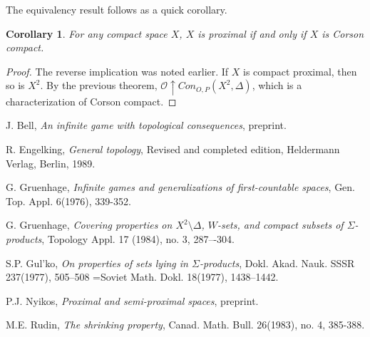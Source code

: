 \documentclass{amsart}
\newtheorem{cor}[thm]{Corollary}
\theoremstyle{definition}
\theoremstyle{remark}
\newcommand{\<}{\langle}
\renewcommand{\>}{\rangle}
\newcommand{\congame}[2]{Con_{O,P}(#1,#2)}
\newcommand{\pl}[1]{\mathscr{#1}}
\newcommand{\win}{\uparrow}
\begin{document}
The equivalency result follows as a quick corollary.

\begin{cor}
  For any compact space $X$, $X$ is proximal if and only if $X$ is Corson compact.
\end{cor}

\begin{proof}
  The reverse implication was noted earlier. If $X$ is compact proximal, then so is $X^2$. By the previous theorem, $\pl O\win\congame{X^2}{\Delta}$, which is a characterization of Corson compact.
\end{proof}




\begin{thebibliography}{99}
 J. Bell,
  \emph{An infinite game with topological consequences}, preprint.

  R. Engelking,
  \emph{General topology}, Revised and completed edition, Heldermann Verlag, Berlin, 1989.




 G. Gruenhage,
  \emph{Infinite games and generalizations of first-countable spaces}, Gen. Top. Appl. 6(1976), 339-352.

  G. Gruenhage,
  \emph{Covering properties on $X^2\setminus\Delta$, $W$-sets, and compact subsets of $\Sigma$-products},
  Topology Appl. 17 (1984), no. 3, 287–-304.


 S.P. Gul'ko, \emph{On properties of sets lying in $\Sigma$-products}, Dokl. Akad. Nauk. SSSR 237(1977), 505--508 =Soviet Math. Dokl. 18(1977), 1438--1442.

  P.J. Nyikos,
  \emph{Proximal and semi-proximal spaces}, preprint.

 M.E. Rudin, \emph{The shrinking property}, Canad. Math. Bull. 26(1983), no. 4, 385-388.

\end{thebibliography}
\end{document}
